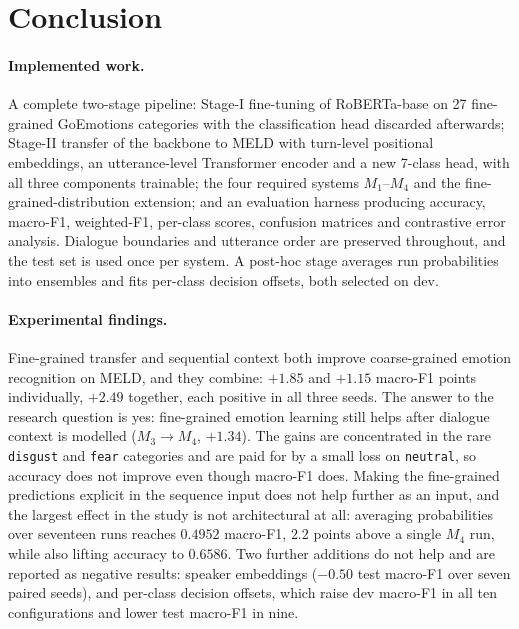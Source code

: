 \documentclass[sigconf,nonacm]{acmart}
\begin{document}
\section{Conclusion}

\paragraph{Implemented work.}
A complete two-stage pipeline: Stage-I fine-tuning of RoBERTa-base on 27 fine-grained
GoEmotions categories with the classification head discarded afterwards; Stage-II transfer
of the backbone to MELD with turn-level positional embeddings, an utterance-level
Transformer encoder and a new 7-class head, with all three components trainable; the four
required systems $M_1$--$M_4$ and the fine-grained-distribution extension; and an evaluation
harness producing accuracy, macro-F1, weighted-F1, per-class scores, confusion matrices and
contrastive error analysis. Dialogue boundaries and utterance order are preserved
throughout, and the test set is used once per system. A post-hoc stage averages run
probabilities into ensembles and fits per-class decision offsets, both selected on dev.

\paragraph{Experimental findings.}
Fine-grained transfer and sequential context both improve coarse-grained emotion
recognition on MELD, and they combine: $+1.85$ and $+1.15$ macro-F1 points individually,
$+2.49$ together, each positive in all three seeds. The answer to the research question is
yes: fine-grained emotion learning still helps after dialogue context is modelled
($M_3 \rightarrow M_4$, $+1.34$). The gains are concentrated in the
rare \texttt{disgust} and \texttt{fear} categories and are paid for by a small loss on
\texttt{neutral}, so accuracy does not improve even though macro-F1 does. Making the
fine-grained predictions explicit in the sequence input does not help further as an input,
and the largest effect in the study is not architectural at all: averaging probabilities
over seventeen runs reaches $0.4952$ macro-F1, $2.2$ points above a single $M_4$ run, while
also lifting accuracy to $0.6586$. Two further additions do not help and are reported as
negative results: speaker embeddings ($-0.50$ test macro-F1 over seven paired seeds), and
per-class decision offsets, which raise dev macro-F1 in all ten configurations and lower
test macro-F1 in nine.
\end{document}
